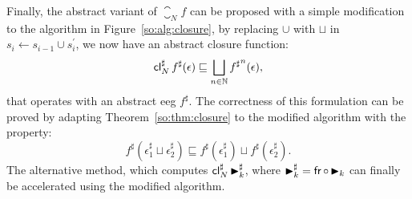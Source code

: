 Finally, the abstract variant of $\closure_N f$ can be proposed with a simple
modification to the algorithm in Figure~\ref{so:alg:closure}, by replacing
$\cup$ with $\sqcup$ in $s_i \gets s_{i-1} \cup s^\prime_i$, we now have
an abstract closure function:
\begin{equation}
    \operatorname{\mathsf{cl}}^\sharp_N f^\sharp (\epsilon)
    \sqsubseteq \bigsqcup_{n \in \mathbb{N}} {f^\sharp}^n (\epsilon),
\end{equation}
that operates with an abstract \gls{eeg} $f^\sharp$.  The correctness of this
formulation can be proved by adapting Theorem~\ref{so:thm:closure} to the
modified algorithm with the property:
\begin{equation}
    f^\sharp\left(\epsilon^\sharp_1 \sqcup \epsilon^\sharp_2\right)
    \sqsubseteq f^\sharp\left(\epsilon^\sharp_1\right)
    \sqcup f^\sharp\left(\epsilon^\sharp_2\right).
\end{equation}
The alternative method, \greedytrace{} which computes $\operatorname{\mathsf{cl}}^\sharp_N
\operatorname{\blacktriangleright}_k^\sharp$, where $\operatorname{\blacktriangleright}_k^\sharp = \operatorname{\mathsf{fr}} \circ \operatorname{\blacktriangleright}_k$ can
finally be accelerated using the modified algorithm.
